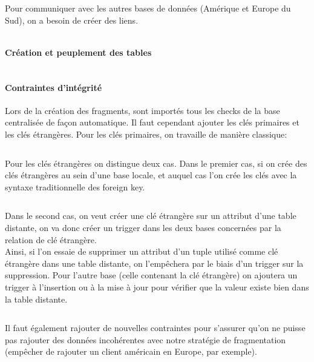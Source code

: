 \documentclass[10pt,a4paper]{article}
\theoremstyle{plain}
\begin{document}
Pour communiquer avec les autres bases de données (Amérique et Europe du Sud), on a besoin de créer des liens.

\inputminted{sql}{INSA-DB12-EuropeNord-creation-liens-db.sql}
\newpage 

\paragraph{Création et peuplement des tables}

\inputminted{sql}{INSA-DB12-EuropeNord-fragmentation.sql}
\newpage 

\paragraph{Contraintes d'intégrité}

Lors de la création des fragments, sont importés tous les checks de la base centralisée de façon automatique. Il faut cependant ajouter les clés primaires et les clés étrangères. Pour les clés primaires, on travaille de manière classique:\\
\inputminted{sql}{INSA-DB12-EuropeNord-contraintes-pk.sql}

\newpage

Pour les clés étrangères on distingue deux cas. Dans le premier cas, si on crée des clés étrangères au sein d'une base locale, et auquel cas l'on crée les clés avec la syntaxe traditionnelle des foreign key.

\inputminted{sql}{INSA-DB12-EuropeNord-contraintes-fk.sql}

Dans le second cas, on veut créer une clé étrangère sur un attribut d'une table distante, on va donc créer un trigger dans les deux bases concernées par la relation de clé étrangère.\\
Ainsi, si l'on essaie de supprimer un attribut d'un tuple utilisé comme clé étrangère dans une table distante, on l'empêchera par le biais d'un trigger sur la suppression. Pour l'autre base (celle contenant la clé étrangère) on ajoutera un trigger à l'insertion ou à la mise à jour pour vérifier que la valeur existe bien dans la table distante. \\

\inputminted{sql}{INSA-DB12-EuropeNord-trigger.sql}

Il faut également rajouter de nouvelles contraintes pour s'assurer qu'on ne puisse pas rajouter des données incohérentes avec notre stratégie de fragmentation (empêcher de rajouter un client américain en Europe, par exemple).
\end{document}
